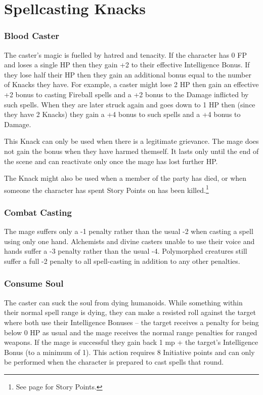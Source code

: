 \section{Spellcasting Knacks}

\begin{multicols}{2}

\subsubsection{Blood Caster}

The caster's magic is fuelled by hatred and tenacity.
If the character has 0 FP and loses a single HP then they gain +2 to their effective Intelligence Bonus.
If they lose half their HP then they gain an additional bonus equal to the number of Knacks they have.
For example, a caster might lose 2 HP then gain an effective +2 bonus to casting Fireball spells and a +2 bonus to the Damage inflicted by such spells.
When they are later struck again and goes down to 1 HP then (since they have 2 Knacks) they gain a +4 bonus to such spells and a +4 bonus to Damage.

This Knack can only be used when there is a legitimate grievance. The mage does not gain the bonus when they have harmed themself. It lasts only until the end of the scene and can reactivate only once the mage has lost further HP.

The Knack might also be used when a member of the party has died, or when someone the character has spent Story Points on has been killed.\footnote{See page \pageref{stories} for Story Points.}

\subsubsection{Combat Casting}

The mage suffers only a -1 penalty rather than the usual -2 when casting a spell using only one hand. Alchemists and divine casters unable to use their voice and hands suffer a -3 penalty rather than the usual -4. Polymorphed creatures still suffer a full -2 penalty to all spell-casting in addition to any other penalties.

\subsubsection{Consume Soul}

The caster can suck the soul from dying humanoids. While something within their normal spell range is dying, they can make a resisted roll against the target where both use their Intelligence Bonuses -- the target receives a penalty for being below 0 HP as usual and the mage receives the normal range penalties for ranged weapons. If the mage is successful they gain back 1 \gls{mp} + the target's Intelligence Bonus (to a minimum of 1).
This action requires 8 Initiative points and can only be performed when the character is prepared to cast spells that \gls{round}.


\end{multicols}
